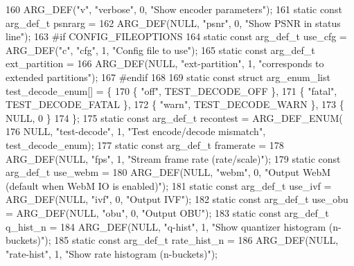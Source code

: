 \begin{DoxyCodeInclude}
{{160     ARG\_DEF(\textcolor{stringliteral}{"v"}, \textcolor{stringliteral}{"verbose"}, 0, \textcolor{stringliteral}{"Show encoder parameters"});
161 \textcolor{keyword}{static} \textcolor{keyword}{const} arg\_def\_t psnrarg =
162     ARG\_DEF(NULL, \textcolor{stringliteral}{"psnr"}, 0, \textcolor{stringliteral}{"Show PSNR in status line"});
163 \textcolor{preprocessor}{#if CONFIG\_FILEOPTIONS}
164 \textcolor{keyword}{static} \textcolor{keyword}{const} arg\_def\_t use\_cfg = ARG\_DEF(\textcolor{stringliteral}{"c"}, \textcolor{stringliteral}{"cfg"}, 1, \textcolor{stringliteral}{"Config file to use"});
165 \textcolor{keyword}{static} \textcolor{keyword}{const} arg\_def\_t ext\_partition =
166     ARG\_DEF(NULL, \textcolor{stringliteral}{"ext-partition"}, 1, \textcolor{stringliteral}{"corresponds to extended partitions"});
167 \textcolor{preprocessor}{#endif}
168 
169 \textcolor{keyword}{static} \textcolor{keyword}{const} \textcolor{keyword}{struct }arg\_enum\_list test\_decode\_enum[] = \{
170   \{ \textcolor{stringliteral}{"off"}, TEST\_DECODE\_OFF \},
171   \{ \textcolor{stringliteral}{"fatal"}, TEST\_DECODE\_FATAL \},
172   \{ \textcolor{stringliteral}{"warn"}, TEST\_DECODE\_WARN \},
173   \{ NULL, 0 \}
174 \};
175 \textcolor{keyword}{static} \textcolor{keyword}{const} arg\_def\_t recontest = ARG\_DEF\_ENUM(
176     NULL, \textcolor{stringliteral}{"test-decode"}, 1, \textcolor{stringliteral}{"Test encode/decode mismatch"}, test\_decode\_enum);
177 \textcolor{keyword}{static} \textcolor{keyword}{const} arg\_def\_t framerate =
178     ARG\_DEF(NULL, \textcolor{stringliteral}{"fps"}, 1, \textcolor{stringliteral}{"Stream frame rate (rate/scale)"});
179 \textcolor{keyword}{static} \textcolor{keyword}{const} arg\_def\_t use\_webm =
180     ARG\_DEF(NULL, \textcolor{stringliteral}{"webm"}, 0, \textcolor{stringliteral}{"Output WebM (default when WebM IO is enabled)"});
181 \textcolor{keyword}{static} \textcolor{keyword}{const} arg\_def\_t use\_ivf = ARG\_DEF(NULL, \textcolor{stringliteral}{"ivf"}, 0, \textcolor{stringliteral}{"Output IVF"});
182 \textcolor{keyword}{static} \textcolor{keyword}{const} arg\_def\_t use\_obu = ARG\_DEF(NULL, \textcolor{stringliteral}{"obu"}, 0, \textcolor{stringliteral}{"Output OBU"});
183 \textcolor{keyword}{static} \textcolor{keyword}{const} arg\_def\_t q\_hist\_n =
184     ARG\_DEF(NULL, \textcolor{stringliteral}{"q-hist"}, 1, \textcolor{stringliteral}{"Show quantizer histogram (n-buckets)"});
185 \textcolor{keyword}{static} \textcolor{keyword}{const} arg\_def\_t rate\_hist\_n =
186     ARG\_DEF(NULL, \textcolor{stringliteral}{"rate-hist"}, 1, \textcolor{stringliteral}{"Show rate histogram (n-buckets)"});
}}
\end{DoxyCodeInclude}
